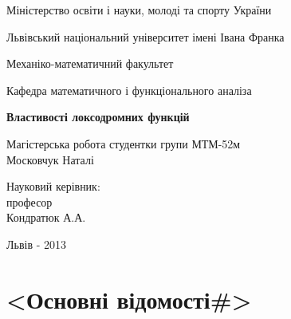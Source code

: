\documentclass[12pt,a4paper]{article}
\begin{document}

\thispagestyle{empty}
\setlength{\parindent}{1.5cm}
\fontsize{14pt}{6mm}\selectfont

\begin{center}
  Міністерство освіти і науки, молоді та спорту України
  
  Львівський національний університет імені Івана Франка

  Механіко-математичний факультет
\end{center}

\vspace{1cm}

\begin{flushright}
  Кафедра математичного і функціонального аналіза
\end{flushright}

\vspace{4cm}

\begin{center}
  {\bfseries\Large Властивості локсодромних функцій}
\end{center}

\vspace{2cm}

\begin{small}
\begin{flushleft}
  Магістерська робота студентки 
  групи МТМ-52м\\
  Московчук Наталі\linebreak
  
  Науковий керівник:\\
  професор\\
  Кондратюк А.А.
\end{flushleft}
\end{small}

\vspace{4cm}

\begin{center}
  Львів - 2013 
\end{center}

\clearpage



\fontsize{14pt}{6mm}\selectfont

\newcommand{\vect}[1]{(#1_1,#1_2,#1_3,\dots,#1_n)}

\thispagestyle{empty}
\tableofcontents
\clearpage
{}

\section{<Основні відомості\#>}
\end{document}
